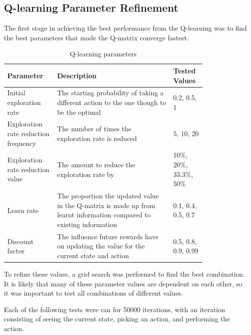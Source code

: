 \documentclass[12pt,a4paper]{article}
\begin{document}
\subsection{Q-learning Parameter Refinement}
The first stage in achieving the best performance from the Q-learning was to find the best parameters that made the Q-matrix converge fastest.
\begin{table}[htb]
\centering
\caption{Q-learning parameters}
\vspace*{6pt}
\label{q_params}
\begin{tabular}{>{\raggedright}p{0.21\linewidth}p{0.5\linewidth}p{0.1\linewidth}}\hline
Parameter & Description& Tested Values\\ \hline\hline
Initial exploration rate & The starting probability of taking a different action to the one though to be the optimal & 0.2, 0.5, 1\\ \hline
Exploration rate reduction frequency & The number of times the exploration rate is reduced & 5, 10, 20\\ \hline
Exploration rate reduction value & The amount to reduce the exploration rate by & 10\%, 20\%, 33.3\%, 50\% \\\hline
Learn rate & The proportion the updated value in the Q-matrix is made up from learnt information compared to existing information & 0.1, 0.4, 0.5,  0.7 \\\hline
Discount factor & The influence future rewards have on updating the value for the current state and action & 0.5, 0.8, 0.9, 0.99 \\\hline
\end{tabular}
\end{table}
To refine these values, a grid search was performed to find the best combination. It is likely that many of these parameter values are dependent on each other, so it was important to test all combinations of different values.

Each of the following tests were ran for 50000 iterations, with an iteration consisting of seeing the current state, picking an action, and performing the action.
\end{document}
